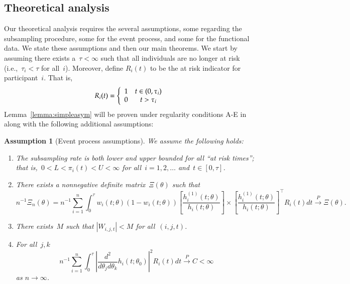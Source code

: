 \documentclass[12pt]{amsart}
\newtheorem{assumption}[thm]{Assumption}
\begin{document}
\subsection{Theoretical analysis}

Our theoretical analysis requires the several assumptions, some
regarding the subsampling procedure, some for the event process, and
some for the functional data. We state these assumptions and then our
main theorems.  
We start by assuming there exists a~$\tau < \infty$ such that all
individuals are no longer at risk (i.e.,~$\tau_i < \tau$ for all~$i$).
Moreover, define $R_i (t)$ to be the at risk indicator for
participant~$i$.  That is,   
\[
R_i (t) = \left \{ \begin{array}{c c} 1 & t \in (0,\tau_i) \\ 0
                                        & t > \tau_i\end{array} \right .
\]
Lemma~\ref{lemma:simpleasym} will be proven under regularity
conditions A-E in~\cite[pp. 420--421]{Andersen1993} along with the
following additional assumptions:

\begin{assumption}[Event process assumptions] 
\label{assumption:events}\normalfont
We assume the following holds:
\begin{enumerate}[label=(E.\arabic*)]
\item\label{E1} The subsampling rate is both lower and upper
  bounded for all ``at risk times''; that is,~$0 < L < \pi_i (t) < U <
  \infty$ for all~$i=1,2,\ldots$ and~$t \in [0,\tau]$. 
\item\label{E2} There exists a nonnegative definite matrix~$\Xi
  (\theta)$ such that
  \[
    n^{-1} \Xi_n (\theta) = n^{-1} \sum_{i=1}^n \int_0^\tau w_i (t;
    \theta) (1 - w_i (t; \theta)) \left[ \frac{h_i^{(1)}(t;
        \theta)}{h_i (t; \theta)} \right] \times  \left [
      \frac{h_i^{(1)} (t;\theta)}{h_i(t; \theta)} \right]^\top R_i (t)
    dt \overset{P}{\to} \Xi (\theta).
  \] 
\item\label{E3} There exists~$M$ such that $|W_{i,j,t}| < M$ for
  all~$(i,j,t)$.
\item\label{E4} For all~$j,k$ 
\[
n^{-1} \sum_{i=1}^n \int_0^\tau \left | \frac{d^2}{d\theta_j
    d\theta_k} h_i (t;\theta_0) \right|^2 R_i (t) dt \overset{P}{\to}
C < \infty
\]
as $n \to \infty$.
\end{enumerate}
\end{assumption}
\end{document}
